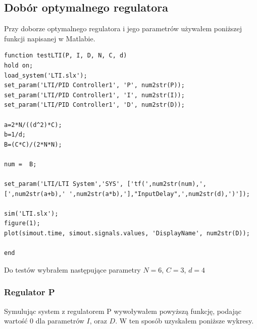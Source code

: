\documentclass[a4paper,10pt]{article}
\begin{document}
\subsection{Dobór optymalnego regulatora}

Przy doborze optymalnego regulatora i jego parametrów używałem poniższej funkcji napisanej w Matlabie.

\begin{lstlisting}[caption=Funkcja testująca system.]
function testLTI(P, I, D, N, C, d)
hold on;
load_system('LTI.slx');
set_param('LTI/PID Controller1', 'P', num2str(P));   
set_param('LTI/PID Controller1', 'I', num2str(I));   
set_param('LTI/PID Controller1', 'D', num2str(D));

a=2*N/((d^2)*C);
b=1/d;
B=(C*C)/(2*N*N);

num =  B;

set_param('LTI/LTI System','SYS', ['tf(',num2str(num),',[',num2str(a+b),' ',num2str(a*b),'],"InputDelay",',num2str(d),')']);

sim('LTI.slx');
figure(1);
plot(simout.time, simout.signals.values, 'DisplayName', num2str(D));

end
\end{lstlisting}

Do testów wybrałem następujące parametry $N = 6$, $C = 3$, $d = 4$

\newpage
\subsubsection{Regulator P}

Symulując system z regulatorem P wywoływałem powyższą funkcję, podając wartość $0$ dla parametrów $I$, oraz $D$. W ten sposób uzyskałem poniższe wykresy.
\end{document}
